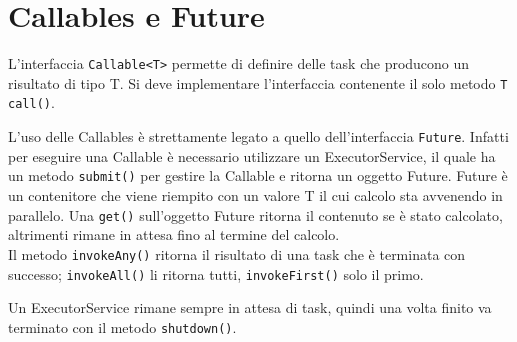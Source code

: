 \section{Callables e Future}
L'interfaccia \texttt{Callable<T>} permette di definire delle task che producono un risultato di tipo T. Si deve implementare l'interfaccia contenente il solo metodo \texttt{T call()}.

L'uso delle Callables è strettamente legato a quello dell'interfaccia \texttt{Future}. Infatti per eseguire una Callable è necessario utilizzare un ExecutorService, il quale ha un metodo \texttt{submit()} per gestire la Callable e ritorna un oggetto Future. Future è un contenitore che viene riempito con un valore T il cui calcolo sta avvenendo in parallelo. Una \texttt{get()} sull'oggetto Future ritorna il contenuto se è stato calcolato, altrimenti rimane in attesa fino al termine del calcolo. \\
Il metodo \texttt{invokeAny()} ritorna il risultato di una task che è terminata con successo; \texttt{invokeAll()} li ritorna tutti, \texttt{invokeFirst()} solo il primo.

Un ExecutorService rimane sempre in attesa di task, quindi una volta finito va terminato con il metodo \texttt{shutdown()}.
